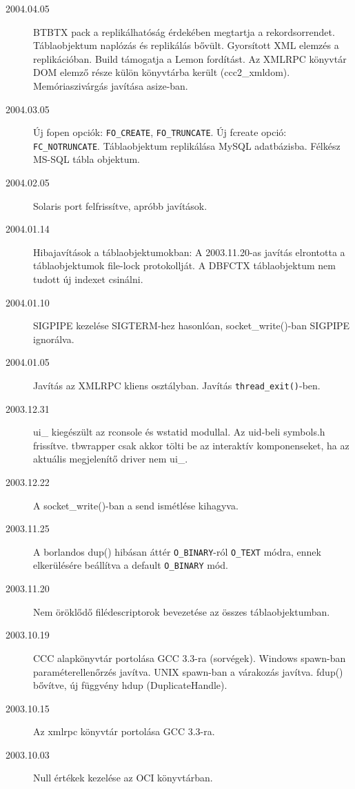 \begin{description}
\item[2004.04.05]
    BTBTX pack a replikálhatóság érdekében megtartja a rekordsorrendet.
    Táblaobjektum naplózás és replikálás bővült.
    Gyorsított XML elemzés a replikációban.
    Build támogatja a Lemon fordítást.
    Az XMLRPC könyvtár DOM elemző része külön könyvtárba került (ccc2\_xmldom).
    Memóriaszivárgás javítása asize-ban.
\item[2004.03.05]
    Új fopen opciók: \verb!FO_CREATE!, \verb!FO_TRUNCATE!.
    Új fcreate opció: \verb!FC_NOTRUNCATE!.
    Táblaobjektum replikálása MySQL adatbázisba.
    Félkész MS-SQL tábla objektum.
\item[2004.02.05]
    Solaris port felfrissítve, apróbb javítások.
\item[2004.01.14]
    Hibajavítások a táblaobjektumokban:
    A 2003.11.20-as javítás elrontotta a táblaobjektumok
    file-lock protokollját. A DBFCTX táblaobjektum nem tudott
    új indexet csinálni.
\item[2004.01.10]
    SIGPIPE kezelése SIGTERM-hez hasonlóan, 
    socket\_write()-ban SIGPIPE ignorálva.
\item[2004.01.05]
    Javítás az XMLRPC kliens osztályban.
    Javítás \verb!thread_exit()!-ben.
\item[2003.12.31]
    ui\_ kiegészült az rconsole és wstatid modullal.
    Az uid-beli symbols.h frissítve.
    tbwrapper csak akkor tölti be az interaktív komponenseket, 
    ha az aktuális megjelenítő driver nem ui\_.
\item[2003.12.22]
    A socket\_write()-ban a send ismétlése kihagyva.
\item[2003.11.25]
    A borlandos dup() hibásan áttér \verb!O_BINARY!-ról \verb!O_TEXT! módra,
    ennek elkerülésére beállítva a default \verb!O_BINARY! mód.
\item[2003.11.20]
    Nem öröklődő filédescriptorok bevezetése az összes
    táblaobjektumban.
\item[2003.10.19]
    CCC alapkönyvtár portolása GCC 3.3-ra (sorvégek).
    Windows spawn-ban paraméterellenőrzés javítva.
    UNIX spawn-ban a várakozás javítva.
    fdup() bővítve, új függvény hdup (DuplicateHandle).
\item[2003.10.15]
    Az xmlrpc könyvtár portolása GCC 3.3-ra.
\item[2003.10.03]
    Null értékek kezelése az OCI könyvtárban.
\end{description}


